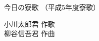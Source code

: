 \documentclass[10pt,b5j]{tarticle} %
\begin{document}
\begin{minipage}[c]{0.7\hsize} %
    \begin{center}
        {\LARGE
            今日の寮歌 %
        }
        {\small 
            （平成5年度寮歌） %
        }
    \end{center}
\end{minipage}
\begin{minipage}[c]{0.3\hsize} %
    \begin{flushright} %
        小川太郎君 作歌\\柳谷信吾君 作曲 %
    \end{flushright}
\end{minipage}
\end{document}
